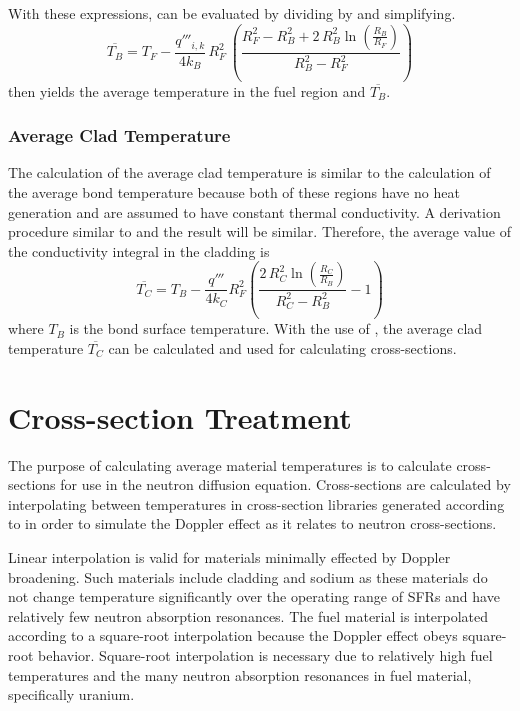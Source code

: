       With these expressions,  can be evaluated by 
      dividing  by  and 
      simplifying.
      \begin{equation}
        \label{eq:tb_bar}
        \overline{T_B} = T_F - \frac{q'''_{i,k}}{4 k_B} \, R_F^2 \, \left(
          \frac{R_F^2 - R_B^2 + 2\,R_B^2 \ln\left(\frac{R_B}{R_F}\right)}
          {R_B^2-R_F^2}\right)
      \end{equation}
       then yields the average temperature in the fuel region
      and $\overline{T_B}$.

    \subsubsection{Average Clad Temperature}
      The calculation of the average clad temperature is similar to the
      calculation of the average bond temperature because both of these regions
      have no heat generation and are assumed to have constant thermal
      conductivity. A derivation procedure similar to
       and the result will be similar. Therefore,
      the average value of the conductivity integral in the cladding is 
      \begin{equation}
        \label{eq:tc_bar}
        \overline{T_C} = T_B - \frac{q'''}{4 k_C} R_F^2 \left(
          \frac{2 \, R_C^2 \ln\left(\frac{R_C}{R_B}\right)}
          {R_C^2 - R_B^2}  - 1\right)
      \end{equation}
      where $T_B$ is the bond surface temperature. With the use of
      , the average clad temperature $\overline{T_C}$ can be
      calculated and used for calculating cross-sections.

\section{Cross-section Treatment}
  The purpose of calculating average material temperatures is to calculate
  cross-sections for use in the neutron diffusion equation. Cross-sections are
  calculated by interpolating between temperatures in cross-section libraries
  generated according to  in order to simulate
  the Doppler effect as it relates to neutron cross-sections.

  Linear interpolation is valid for materials minimally effected by Doppler 
  broadening. Such materials include cladding and sodium as these materials do 
  not change temperature significantly over the operating range of SFRs
  and have relatively few neutron absorption resonances. The fuel material is 
  interpolated according to a square-root interpolation because the Doppler 
  effect obeys square-root behavior. Square-root interpolation is necessary
  due to relatively high fuel temperatures and the many neutron absorption 
  resonances in fuel material, specifically uranium.

